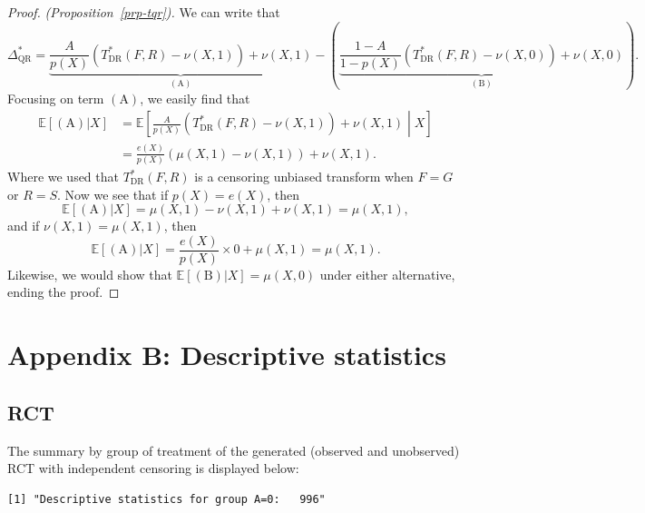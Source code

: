 \documentclass[
  11pt,
  a4paper,
]{article}
\theoremstyle{plain}
\theoremstyle{plain}
\theoremstyle{plain}
\theoremstyle{definition}
\theoremstyle{remark}
\begin{document}
\begin{proof}
\emph{(Proposition~\ref{prp-tqr}).} We can write that \[
\Delta^*_{\mathrm{QR}} = \underbrace{\frac{A}{p(X)}(T^*_{\mathrm{DR}}(F,R)-\nu(X,1))+ \nu(X,1)}_{(\mathrm{A})} - \left(\underbrace{\frac{1-A}{1-p(X)}(T^*_{\mathrm{DR}}(F,R)-\nu(X,0))+ \nu(X,0)}_{(\mathrm{B})} \right). 
\] Focusing on term \((\mathrm{A})\), we easily find that \[
\begin{aligned}
\mathbb{E}[(\mathrm{A}) |X] &= \mathbb{E}\left[\frac{A}{p(X)}(T^*_{\mathrm{DR}}(F,R)-\nu(X,1))+ \nu(X,1) \middle|X\right] \\
&= \frac{e(X)}{p(X)}(\mu(X,1)-\nu(X,1)) + \nu(X,1).
\end{aligned}
\] Where we used that \(T^*_{\mathrm{DR}}(F,R)\) is a censoring unbiased
transform when \(F=G\) or \(R=S\). Now we see that if \(p(X) = e(X)\),
then \[
\mathbb{E}[(\mathrm{A}) |X] = \mu(X,1)-\nu(X,1) + \nu(X,1) = \mu(X,1),
\] and if \(\nu(X,1) = \mu(X,1)\), then \[
\mathbb{E}[(\mathrm{A}) |X] = \frac{e(X)}{p(X)} \times 0 + \mu(X,1) = \mu(X,1).
\] Likewise, we would show that
\(\mathbb{E}[(\mathrm{B}) |X] = \mu(X,0)\) under either alternative,
ending the proof.
\end{proof}

\section{Appendix B: Descriptive
statistics}\label{appendix-b-descriptive-statistics}

\subsection{RCT}\label{sec-stat_RCT}

The summary by group of treatment of the generated (observed and
unobserved) RCT with independent censoring is displayed below:

\begin{verbatim}
[1] "Descriptive statistics for group A=0:   996"
\end{verbatim}
\end{document}
